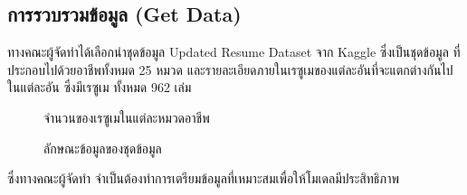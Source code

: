 \subsection{การรวบรวมข้อมูล (Get Data)}
ทางคณะผู้จัดทำได้เลือกนำชุดข้อมูล Updated Resume Dataset \cite{dataset} จาก Kaggle ซึ่งเป็นชุดข้อมูล
ที่ประกอบไปด้วยอาชีพทั้งหมด 25 หมวด และรายละเอียดภายในเรซูเมของแต่ละอันที่จะแตกต่างกันไปในแต่ละอัน ซึ่งมีเรซูเม
ทั้งหมด 962 เล่ม
\begin{figure}[h]\centering
    \setlength{\fboxrule}{0.2mm} %
    \setlength{\fboxsep}{0.5cm}
    \caption{จำนวนของเรซูเมในแต่ละหมวดอาชีพ}\label{fig:datasetCategory}
\end{figure}
\begin{figure}[h]\centering
    \setlength{\fboxrule}{0.2mm} %
    \setlength{\fboxsep}{0.5cm}
    \caption{ลักษณะข้อมูลของชุดข้อมูล}\label{fig:datasetData}
\end{figure}
\par ซึ่งทางคณะผู้จัดทำ จำเป็นต้องทำการเตรียมข้อมูลที่เหมาะสมเพื่อให้โมเดลมีประสิทธิภาพ

